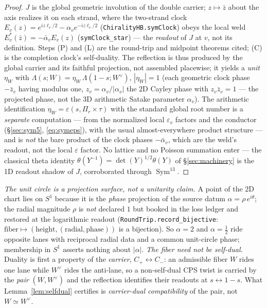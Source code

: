 \documentclass[11pt]{article}
\theoremstyle{definition}
\newcommand{\Sym}{\operatorname{Sym}}
\begin{document}
\begin{proof}
$J$ is the global geometric involution of the double carrier; $z\mapsto\bar z$ about the axis realizes it on
each strand, where the two-strand clock $E_v(z)=e^{iz\ell_v/2}-\alpha_v e^{-iz\ell_v/2}$
(\texttt{ChiralityHB.symClock}) obeys the local weld $E_v^{*}(\bar z)=-\bar\alpha_v E_v(z)$
(\texttt{symClock\_star}) --- the \emph{readout} of $J$ at $v$, not its definition. Steps (P) and (L) are the
round-trip and midpoint theorems cited; (C) is the completion clock's self-duality. The reflection is thus
produced by the global carrier and its faithful projection, not assembled placewise; it yields a \emph{unit}
$\eta_W$ with $\Lambda(s;W)=\eta_W\,\Lambda(1-s;W^\vee)$, $|\eta_W|=1$ (each geometric clock phase
$-\bar z_v$ having modulus one, $z_v=\alpha_v/|\alpha_v|$ the $2$D Cayley phase with $z_v\bar z_v=1$ --- the
projected phase, not the $3$D arithmetic Satake parameter $\alpha_v$). The arithmetic identification
$\eta_W=\varepsilon(s,\Pi_r\times\tau)$
with the standard global root number is a \emph{separate} computation --- from the normalized local
$\varepsilon_v$ factors and the conductor (\S\ref{sec:sym5}, \eqref{eq:symeps}), with the usual
almost-everywhere product structure --- and is \emph{not} the bare product of the clock phases $-\bar\alpha_v$,
which are the weld's readout, not the local $\varepsilon$ factor. No lattice and no Poisson summation enter ---
the classical theta identity $\theta(Y^{-1})=\det(Y)^{1/2}\theta(Y)$ of \S\ref{sec:machinery} is the 1D readout
shadow of $J$, corroborated through $\Sym^{13}$.
\end{proof}

\noindent\emph{The unit circle is a projection surface, not a unitarity claim.} A point of the 2D chart lies
on $S^1$ because it is the \emph{phase} projection of the source datum $\alpha=\rho\,e^{i\theta}$; the radial
magnitude $\rho$ is \emph{not} declared $1$ but booked in the loss ledger and restored at the logarithmic
readout (\texttt{RoundTrip.record\_bijective}: $\text{fiber}\mapsto(\text{height},(\text{radial},\text{phase}))$
is a bijection). So $\alpha=2$ and $\alpha=\tfrac12$ ride opposite lanes with reciprocal radial data and a
common unit-circle phase; membership in $S^1$ asserts nothing about $|\alpha|$. \emph{The fiber need not be
self-dual.} Duality is first a property of the \emph{carrier}, $C_+\leftrightarrow C_-$: an admissible fiber
$W$ rides one lane while $W^\vee$ rides the anti-lane, so a non-self-dual CPS twist is carried by the
\emph{pair} $(W,W^\vee)$ and the reflection identifies their readouts at $s\leftrightarrow1-s$. What
Lemma~\ref{lem:selfdual} certifies is \emph{carrier-dual compatibility} of the pair, not $W\simeq W^\vee$.
\end{document}
